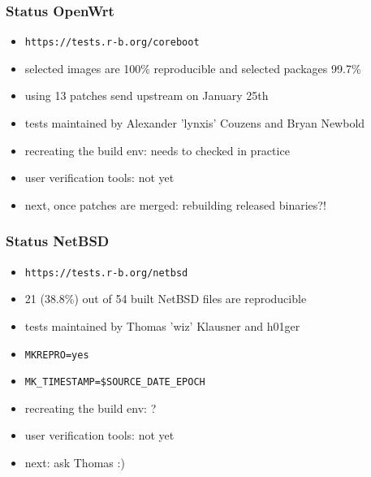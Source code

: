 \documentclass[14pt]{beamer}
\begin{document}
\begin{frame}
 \frametitle{Status OpenWrt}
 \begin{itemize}
  \item \texttt{https://tests.r-b.org/coreboot}
  \item selected images are 100\% reproducible and selected packages 99.7\%
  \item using 13 patches send upstream on January 25th
  \item tests maintained by Alexander 'lynxis' Couzens and Bryan Newbold
  \item recreating the build env: needs to checked in practice
  \item user verification tools: not yet
  \item next, once patches are merged: rebuilding released binaries?!
 \end{itemize}
\end{frame}

\begin{frame}
 \frametitle{Status NetBSD}
 \begin{itemize}
  \item \texttt{https://tests.r-b.org/netbsd}
  \item 21 (38.8\%) out of 54 built NetBSD files are reproducible
  \item tests maintained by Thomas 'wiz' Klausner and h01ger
  \item \texttt{MKREPRO=yes}
  \item \texttt{MK\_TIMESTAMP=\$SOURCE\_DATE\_EPOCH}
  \item recreating the build env: ?
  \item user verification tools: not yet
  \item next: ask Thomas :)
 \end{itemize}
\end{frame}
\end{document}
